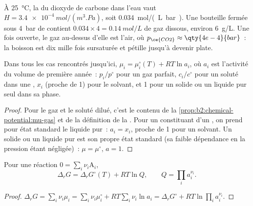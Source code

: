 \begin{example}\label{ex:b2:chemical-potential:soda}
À \qty{25}{\celsius}, la  du dioxyde de carbone dans l'eau vaut $H =
\qty{3.4e-4}{mol/(m^3.Pa)}$, soit \qty{0.034}{mol/(L.bar)}. Une bouteille
fermée sous \qty{4}{bar} de  contient $0.034 \times 4 =
\qty{0.14}{mol/L}$ de gaz dissous, environ \qty{6}{g/L}. Une fois ouverte, le gaz
au-dessus d'elle est l'air, où $p_{\ce{CO2}} \approx \qty{4e-4}{bar}$~: la boisson est
dix mille fois sursaturée et pétille jusqu'à devenir plate.
\end{example}

\begin{proposition}\label{prop:b2:chemical-potential:activity}
Dans tous les cas rencontrés jusqu'ici, $\mu_i = \mu_i^\circ(T) + RT\ln a_i$, où $a_i$
est l'activité du volume de première année~: $p_i/p^\circ$ pour un gaz parfait,
$c_i/c^\circ$ pour un soluté dans une , $x_i$ (proche de 1)
pour le solvant, et 1 pour un solide ou un liquide pur seul dans sa phase.
\end{proposition}

\begin{proof}
Pour le gaz et le soluté dilué, c'est le contenu de la
\cref{prop:b2:chemical-potential:mu-gas} et de la définition de la . Pour un constituant d'un , on prend pour état standard
le liquide pur~: $a_i = x_i$, proche de 1 pour un solvant. Un solide ou un liquide
pur est son propre état standard (sa faible dépendance en la pression étant
négligée)~: $\mu = \mu^\circ$, $a = 1$.
\end{proof}

\begin{proposition}\label{prop:b2:chemical-potential:delta-g-q}
Pour une réaction $0 = \sum_i\nu_i\mathrm A_i$,
\[
  \Delta_r G = \Delta_r G^\circ(T) + RT\ln Q, \qquad Q = \prod_i a_i^{\nu_i} .
\]
\end{proposition}

\begin{proof}
$\Delta_r G = \sum_i\nu_i\mu_i = \sum_i\nu_i\mu_i^\circ + RT\sum_i\nu_i\ln a_i =
\Delta_r G^\circ + RT\ln\prod_i a_i^{\nu_i}$.
\end{proof}

